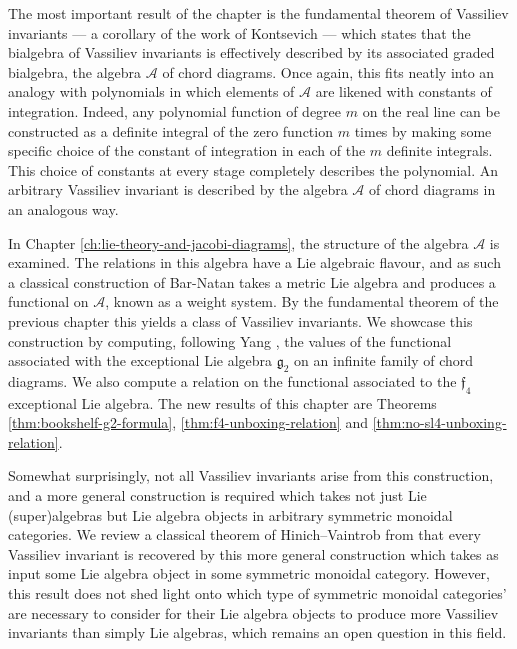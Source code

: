 The most important result of the chapter is the fundamental theorem of Vassiliev invariants --- a corollary of the work of Kontsevich \cite{vassilievs-knot-invariants} --- which states that the bialgebra of Vassiliev invariants is effectively described by its associated graded bialgebra, the algebra \(\mathcal{A}\) of chord diagrams. Once again, this fits neatly into an analogy with polynomials in which elements of \(\mathcal{A}\) are likened with constants of integration. Indeed, any polynomial function of degree \(m\) on the real line can be constructed as a definite integral of the zero function \(m\) times by making some specific choice of the constant of integration in each of the \(m\) definite integrals. This choice of constants at every stage completely describes the polynomial. An arbitrary Vassiliev invariant is described by the algebra \(\mathcal{A}\) of chord diagrams in an analogous way.

In Chapter \ref{ch:lie-theory-and-jacobi-diagrams}, the structure of the algebra \(\mathcal{A}\) is examined. The relations in this algebra have a Lie algebraic flavour, and as such a classical construction of Bar-Natan takes a metric Lie algebra and produces a functional on \(\mathcal{A}\), known as a weight system. By the fundamental theorem of the previous chapter this yields a class of Vassiliev invariants. We showcase this construction by computing, following Yang \cite{on-values-of-sl3-weight-system-on-chord-diagrams-whose-intersection-graph-is-complete-bipartite}, the values of the functional associated with the exceptional Lie algebra \(\mathfrak{g}_{2}\) on an infinite family of chord diagrams. We also compute a relation on the functional associated to the \(\mathfrak{f}_{4}\) exceptional Lie algebra. The new results of this chapter are Theorems \ref{thm:bookshelf-g2-formula}, \ref{thm:f4-unboxing-relation} and \ref{thm:no-sl4-unboxing-relation}.

Somewhat surprisingly, not all Vassiliev invariants arise from this construction, and a more general construction is required which takes not just Lie (super)algebras but Lie algebra objects in arbitrary symmetric monoidal categories. We review a classical theorem of Hinich--Vaintrob from \cite{cyclic-operads-and-the-algebra-of-chord-diagrams} that every Vassiliev invariant is recovered by this more general construction which takes as input some Lie algebra object in some symmetric monoidal category. However, this result does not shed light onto which type of symmetric monoidal categories' are necessary to consider for their Lie algebra objects to produce more Vassiliev invariants than simply Lie algebras, which remains an open question in this field.

